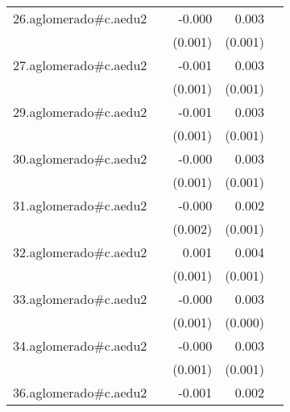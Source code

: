 {\begin{longtable}{l*{4}{D{.}{.}{-1}}}
\addlinespace
26.aglomerado#c.aedu2&                     &      -0.000         &       0.003\sym{***}&                     \\
            &                     &     (0.001)         &     (0.001)         &                     \\
\addlinespace
27.aglomerado#c.aedu2&                     &      -0.001         &       0.003\sym{***}&                     \\
            &                     &     (0.001)         &     (0.001)         &                     \\
\addlinespace
29.aglomerado#c.aedu2&                     &      -0.001         &       0.003\sym{***}&                     \\
            &                     &     (0.001)         &     (0.001)         &                     \\
\addlinespace
30.aglomerado#c.aedu2&                     &      -0.000         &       0.003\sym{**} &                     \\
            &                     &     (0.001)         &     (0.001)         &                     \\
\addlinespace
31.aglomerado#c.aedu2&                     &      -0.000         &       0.002         &                     \\
            &                     &     (0.002)         &     (0.001)         &                     \\
\addlinespace
32.aglomerado#c.aedu2&                     &       0.001         &       0.004\sym{***}&                     \\
            &                     &     (0.001)         &     (0.001)         &                     \\
\addlinespace
33.aglomerado#c.aedu2&                     &      -0.000         &       0.003\sym{***}&                     \\
            &                     &     (0.001)         &     (0.000)         &                     \\
\addlinespace
34.aglomerado#c.aedu2&                     &      -0.000         &       0.003\sym{***}&                     \\
            &                     &     (0.001)         &     (0.001)         &                     \\
\addlinespace
36.aglomerado#c.aedu2&                     &      -0.001         &       0.002\sym{**} &                     \\

\end{longtable}}
